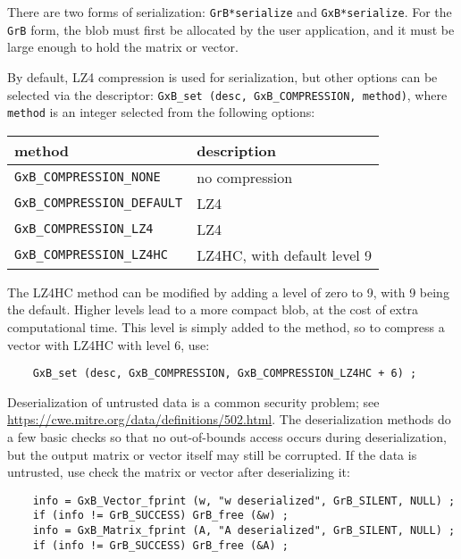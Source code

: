 \documentclass[12pt]{article}
\begin{document}
{There are two forms of serialization: \verb'GrB*serialize' and
\verb'GxB*serialize'.  For the \verb'GrB' form, the blob must first be
allocated by the user application, and it must be large enough to hold the
matrix or vector.

By default, LZ4 compression is used for serialization, but other options can be
selected via the descriptor: \verb'GxB_set (desc, GxB_COMPRESSION, method)',
where \verb'method' is an integer selected from the following options:

\vspace{0.2in}
{\footnotesize
\begin{tabular}{ll}
\hline
method                           &  description \\
\hline
\verb'GxB_COMPRESSION_NONE'      &  no compression \\
\verb'GxB_COMPRESSION_DEFAULT'   &  LZ4 \\
\verb'GxB_COMPRESSION_LZ4'       &  LZ4 \\
\verb'GxB_COMPRESSION_LZ4HC'     &  LZ4HC, with default level 9 \\
\hline
\end{tabular} }
\vspace{0.2in}

The LZ4HC method can be modified by adding a level of zero to 9, with 9 being
the default.  Higher levels lead to a more compact blob, at the cost of extra
computational time. This level is simply added to the method, so to compress a
vector with LZ4HC with level 6, use:

    {\footnotesize
    \begin{verbatim}
    GxB_set (desc, GxB_COMPRESSION, GxB_COMPRESSION_LZ4HC + 6) ; \end{verbatim}}

Deserialization of untrusted data is a common security problem; see
\url{https://cwe.mitre.org/data/definitions/502.html}. The deserialization
methods do a few basic checks so that no out-of-bounds access occurs during
deserialization, but the output matrix or vector itself may still be corrupted.
If the data is untrusted, use check the matrix or vector after
deserializing it:

{\footnotesize
\begin{verbatim}
    info = GxB_Vector_fprint (w, "w deserialized", GrB_SILENT, NULL) ;
    if (info != GrB_SUCCESS) GrB_free (&w) ;
    info = GxB_Matrix_fprint (A, "A deserialized", GrB_SILENT, NULL) ;
    if (info != GrB_SUCCESS) GrB_free (&A) ; \end{verbatim}}

}
\end{document}
